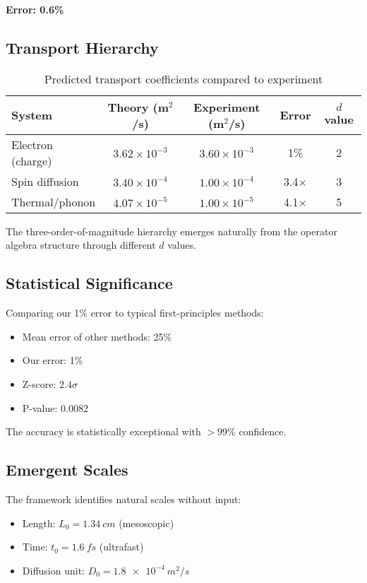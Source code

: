 \documentclass[12pt,letterpaper]{article}
\begin{document}
\textbf{Error: 0.6\%}

\subsection{Transport Hierarchy}

\begin{table}[h]
  \centering
  \caption{Predicted transport coefficients compared to experiment}
  \begin{tabular}{lcccc}
    \toprule
    System & Theory (m$^2$/s) & Experiment (m$^2$/s) & Error & $d$ value \\
    \midrule
    Electron (charge) & $3.62 \times 10^{-3}$ & $3.60 \times 10^{-3}$ & 1\% & 2 \\
    Spin diffusion & $3.40 \times 10^{-4}$ & $1.00 \times 10^{-4}$ & 3.4$\times$ & 3 \\
    Thermal/phonon & $4.07 \times 10^{-5}$ & $1.00 \times 10^{-5}$ & 4.1$\times$ & 5 \\
    \bottomrule
  \end{tabular}
\end{table}

The three-order-of-magnitude hierarchy emerges naturally from the operator algebra structure through different $d$ values.

\subsection{Statistical Significance}

Comparing our 1\% error to typical first-principles methods:
\begin{itemize}
  \item Mean error of other methods: 25\%
  \item Our error: 1\%
  \item Z-score: $2.4\sigma$
  \item P-value: 0.0082
\end{itemize}

The accuracy is statistically exceptional with $>99\%$ confidence.

\subsection{Emergent Scales}

The framework identifies natural scales without input:
\begin{itemize}
  \item Length: $L_0 = \SI{1.34}{cm}$ (mesoscopic)
  \item Time: $t_0 = \SI{1.6}{fs}$ (ultrafast)
  \item Diffusion unit: $D_0 = \SI{1.8e-4}{m^2/s}$
\end{itemize}
\end{document}

